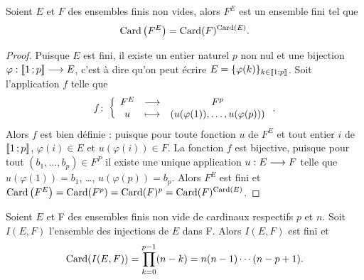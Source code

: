 \begin{theo}
  Soient \(E\) et \(F\) des ensembles finis non vides, alors \(F^E\) est un
  ensemble fini tel que
  \begin{equation}
    \operatorname{Card}\left(F^E\right) = \operatorname{Card}(F)^{\operatorname{Card}(E)}.
  \end{equation}
\end{theo}

\begin{proof}
  Puisque \(E\) est fini, il existe un entier naturel \(p\) non nul et une
  bijection \(\varphi:\mathopen{\llbracket}1\mathclose{}\mathpunct{};p\mathclose{\rrbracket} \longrightarrow{} E\), c'est à dire
  qu'on peut écrire \(E = \{\varphi(k)\}_{k\in\mathopen{\llbracket}1\mathclose{}\mathpunct{};p\mathclose{\rrbracket}}\). Soit
  l'application \(f\) telle que
  \begin{equation}
    f\colon\left\{\begin{array}{ccc}F^E & \longrightarrow &F^p\\u & \longmapsto & (u(\varphi(1)), \ldots, u(\varphi(p)))\end{array}\right..
  \end{equation}
  Alors \(f\) est bien définie : puisque pour toute fonction \(u\) de \(F^E\) et
  tout entier \(i\) de \(\mathopen{\llbracket}1\mathclose{}\mathpunct{};p\mathclose{\rrbracket}\), \(\varphi(i) \in E\) et
  \(u(\varphi(i))\in F\). La fonction \(f\) est bijective, puisque pour tout
  \((b_1, \ldots, b_p) \in F^P\) il existe une unique application
  \(u:E \longrightarrow{} F\) telle que \(u(\varphi(1)) = b_1\), \ldots,
  \(u(\varphi(p)) = b_p\). Alors \(F^E\) est fini et \(\operatorname{Card}\left(F^E\right) =
  \operatorname{Card}(F^p) = \operatorname{Card}(F)^p = \operatorname{Card}(F)^{\operatorname{Card}(E)}\).
\end{proof}

\begin{prop}
  \label{prop:nbinj}
  Soient \(E\) et F des ensembles finis non vide de cardinaux respectifs \(p\)
  et \(n\). Soit \(I(E, F)\) l'ensemble des injections de \(E\) dans F. Alors
  \(I(E, F)\) est fini et
  \begin{equation}
    \operatorname{Card}(I(E, F)) = \prod_{k = 0}^{p - 1}(n - k) = n(n - 1) \dotsm (n - p + 1).
  \end{equation}
\end{prop}

